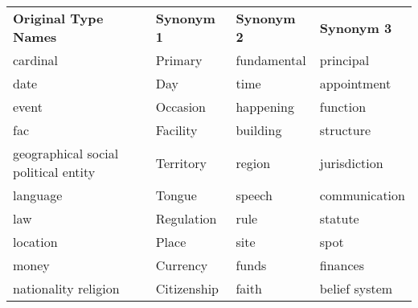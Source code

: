 \documentclass[11pt]{article}
\begin{document}
\begin{table*}[htb]
\small
\begin{center}
    {
    \begin{tabular}{llll}
    \toprule
    \multicolumn{1}{l}{\textbf{Original Type Names}} & \multicolumn{1}{l}{\textbf{Synonym 1}} & \multicolumn{1}{l}{\textbf{Synonym 2}} & \multicolumn{1}{l}{\textbf{Synonym 3}} \\
    \cmidrule(lr){1-1} \cmidrule(lr){2-4}
    cardinal                                         & Primary                                & fundamental                            & principal                              \\
    date                                             & Day                                    & time                                   & appointment                            \\
    event                                            & Occasion                               & happening                              & function                               \\
    fac                                              & Facility                               & building                               & structure                              \\
    geographical social political entity             & Territory                              & region                                 & jurisdiction                           \\
    language                                         & Tongue                                 & speech                                 & communication                          \\
    law                                              & Regulation                             & rule                                   & statute                                \\
    location                                         & Place                                  & site                                   & spot                                   \\
    money                                            & Currency                               & funds                                  & finances                               \\
    nationality religion                             & Citizenship                            & faith                                  & belief system                          \\

\end{tabular}}
\end{center}
\end{table*}
\end{document}
